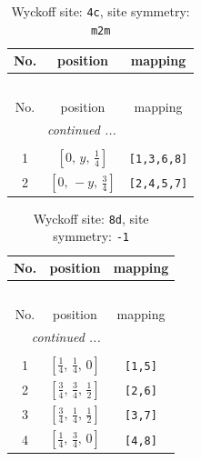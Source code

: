 \documentclass[fleqn,8pt]{jsarticle}
\begin{document}
\renewcommand{\arraystretch}{1.2}
\begin{longtable}{ccc}
\caption{Wyckoff site: {\tt 4c}, site symmetry: {\tt m2m}}
 \\
 \hline \hline
No. & position & mapping \\ \hline \endfirsthead

\multicolumn{2}{l}{\tablename\ \thetable{}} \\
 \hline \hline
No. & position & mapping \\ \hline \endhead

 \hline \hline
\multicolumn{2}{r}{\footnotesize\it continued ...} \\ \endfoot

 \hline \hline
\multicolumn{2}{r}{} \\ \endlastfoot

1 & $\left[ 0,\, y,\, \frac{1}{4} \right]$ & {\tt [1,3,6,8]} \\ \hline
2 & $\left[ 0,\, - y,\, \frac{3}{4} \right]$ & {\tt [2,4,5,7]} \\
\end{longtable}
\renewcommand{\arraystretch}{1.2}
\begin{longtable}{ccc}
\caption{Wyckoff site: {\tt 8d}, site symmetry: {\tt -1}}
 \\
 \hline \hline
No. & position & mapping \\ \hline \endfirsthead

\multicolumn{2}{l}{\tablename\ \thetable{}} \\
 \hline \hline
No. & position & mapping \\ \hline \endhead

 \hline \hline
\multicolumn{2}{r}{\footnotesize\it continued ...} \\ \endfoot

 \hline \hline
\multicolumn{2}{r}{} \\ \endlastfoot

1 & $\left[ \frac{1}{4},\, \frac{1}{4},\, 0 \right]$ & {\tt [1,5]} \\ \hline
2 & $\left[ \frac{3}{4},\, \frac{3}{4},\, \frac{1}{2} \right]$ & {\tt [2,6]} \\ \hline
3 & $\left[ \frac{3}{4},\, \frac{1}{4},\, \frac{1}{2} \right]$ & {\tt [3,7]} \\ \hline
4 & $\left[ \frac{1}{4},\, \frac{3}{4},\, 0 \right]$ & {\tt [4,8]} \\
\end{longtable}
\renewcommand{\arraystretch}{1.2}
\end{document}
